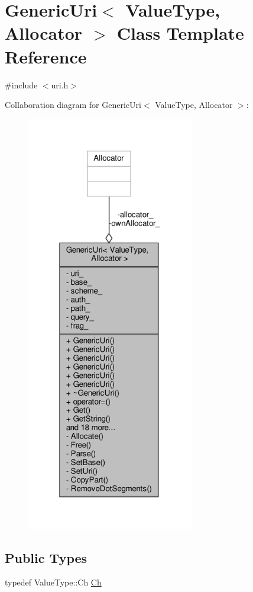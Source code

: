 \hypertarget{classGenericUri}{}\section{Generic\+Uri$<$ Value\+Type, Allocator $>$ Class Template Reference}
\label{classGenericUri}


{\ttfamily \#include $<$uri.\+h$>$}



Collaboration diagram for Generic\+Uri$<$ Value\+Type, Allocator $>$\+:
\nopagebreak
\begin{figure}[H]
\begin{center}
\leavevmode
\includegraphics[width=208pt]{classGenericUri__coll__graph}
\end{center}
\end{figure}
\subsection*{Public Types}
\begin{DoxyCompactItemize}
\item 
typedef Value\+Type\+::\+Ch \hyperlink{classGenericUri_a20d0602cff62211d89bc4b25963beeee}{Ch}
\end{DoxyCompactItemize}
